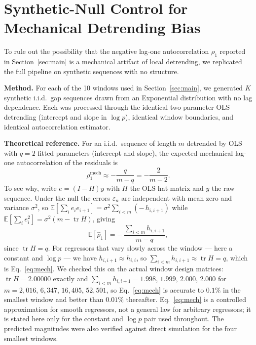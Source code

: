 \documentclass[11pt]{article}
\begin{document}


\section{Synthetic-Null Control for Mechanical Detrending Bias}

To rule out the possibility that the negative lag-one autocorrelation
$\rho_1$ reported in Section~\ref{sec:main} is a mechanical artifact
of local detrending, we replicated the full pipeline on synthetic
sequences with no structure.

\noindent\textbf{Method.} For each of the 10 windows used in
Section~\ref{sec:main}, we generated $K$ synthetic i.i.d.\ gap
sequences drawn from an Exponential distribution with no lag
dependence. Each was processed through the identical two-parameter OLS
detrending (intercept and slope in $\log p$), identical window
boundaries, and identical autocorrelation estimator.

\noindent\textbf{Theoretical reference.} For an i.i.d.\ sequence of
length $m$ detrended by OLS with $q = 2$ fitted parameters (intercept
and slope), the expected mechanical lag-one autocorrelation of the
residuals is
\begin{equation}
\rho_1^{\text{mech}} \approx -\frac{q}{m-q} = -\frac{2}{m-2}.
\label{eq:mech}
\end{equation}
To see why, write $e = (I - H)y$ with $H$ the OLS hat matrix and
$y$ the raw sequence. Under the null the errors $\varepsilon_n$ are
independent with mean zero and variance $\sigma^2$, so
$\mathbb{E}[\sum_i e_i e_{i+1}] = \sigma^2\sum_{i<m}(-\,h_{i,i+1})$
while
$\mathbb{E}[\sum_i e_i^2] = \sigma^2(m - \operatorname{tr}H)$, giving
\[
\mathbb{E}[\hat\rho_1] = -\,\frac{\sum_{i<m} h_{i,i+1}}{m - q},
\]
since $\operatorname{tr}H = q$. For regressors that vary slowly across
the window --- here a constant and $\log p$ --- we have
$h_{i,i+1} \approx h_{i,i}$, so $\sum_{i<m} h_{i,i+1}
\approx \operatorname{tr}H = q$, which is Eq.~\eqref{eq:mech}. We
checked this on the actual window design matrices: $\operatorname{tr}H
= 2.00000$ exactly and $\sum_{i<m} h_{i,i+1} = 1.998$, $1.999$,
$2.000$, $2.000$ for $m = 2{,}016$, $6{,}347$, $16{,}405$,
$52{,}501$, so Eq.~\eqref{eq:mech} is accurate to $0.1\%$ in the
smallest window and better than $0.01\%$ thereafter. Eq.~\eqref{eq:mech}
is a controlled approximation for smooth regressors, not a general law
for arbitrary regressors; it is stated here only for the constant and
$\log p$ pair used throughout. The predicted magnitudes were also
verified against direct simulation for the four smallest windows.
\end{document}
